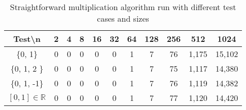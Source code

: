 \documentclass[tikz, 12pt]{scrartcl}
\begin{document}
\begin{table}
\caption{Straightforward multiplication algorithm run with different test cases and sizes}
\centering
\begin{tabular}{|c|cccccccccc|}
\hline
Test\textbackslash  n		&	2	&	4	&	8	&	16	&	32	&	64	&	128	&	256	&	512	&	1024\\
\hline
\{0, 1\}				&	0	&	0	&	0	&	0	&	0	&	1	&	7	&	76	&	1,175	&	15,102\\
\{0, 1, 2 \}				&	0	&	0	&	0	&	0	&	0	&	1	&	7	&	75	&	1,117	&	14,380\\
\{0, 1, -1\}				&	0	&	0	&	0	&	0	&	0	&	1	&	7	&	76	&	1,119	&	14,382\\
$[0, 1] \in \mathbb{R}$	&	0	&	0	&	0	&	0	&	0	&	1	&	7	&	77	&	1,120	&	14,420\\
\hline
\end{tabular}
\end{table}
\end{document}
